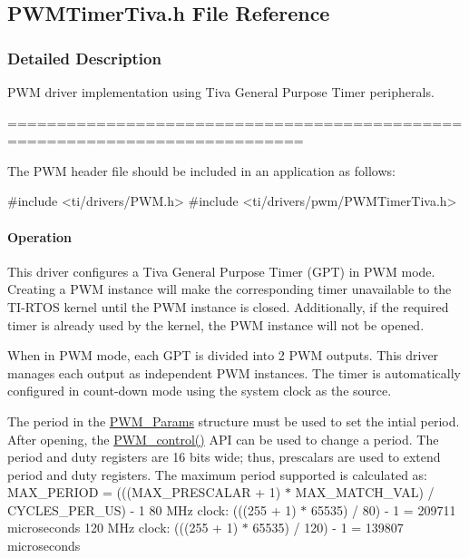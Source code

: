 \subsection{P\+W\+M\+Timer\+Tiva.\+h File Reference}
\label{_p_w_m_timer_tiva_8h}


\subsubsection{Detailed Description}
P\+W\+M driver implementation using Tiva General Purpose Timer peripherals. 

============================================================================

The P\+W\+M header file should be included in an application as follows\+: 
\begin{DoxyCode}
\textcolor{preprocessor}{#include <ti/drivers/PWM.h>}
\textcolor{preprocessor}{#include <ti/drivers/pwm/PWMTimerTiva.h>}
\end{DoxyCode}


\paragraph*{Operation}

This driver configures a Tiva General Purpose Timer (G\+P\+T) in P\+W\+M mode. Creating a P\+W\+M instance will make the corresponding timer unavailable to the T\+I-\/\+R\+T\+O\+S kernel until the P\+W\+M instance is closed. Additionally, if the required timer is already used by the kernel, the P\+W\+M instance will not be opened.

When in P\+W\+M mode, each G\+P\+T is divided into 2 P\+W\+M outputs. This driver manages each output as independent P\+W\+M instances. The timer is automatically configured in count-\/down mode using the system clock as the source.

The period in the \hyperlink{struct_p_w_m___params}{P\+W\+M\+\_\+\+Params} structure must be used to set the intial period. After opening, the \hyperlink{_p_w_m_8h_ade999f5b12997479efa1ac85aaf46ef5}{P\+W\+M\+\_\+control()} A\+P\+I can be used to change a period. The period and duty registers are 16 bits wide; thus, prescalars are used to extend period and duty registers. The maximum period supported is calculated as\+: M\+A\+X\+\_\+\+P\+E\+R\+I\+O\+D = (((M\+A\+X\+\_\+\+P\+R\+E\+S\+C\+A\+L\+A\+R + 1) $\ast$ M\+A\+X\+\_\+\+M\+A\+T\+C\+H\+\_\+\+V\+A\+L) / C\+Y\+C\+L\+E\+S\+\_\+\+P\+E\+R\+\_\+\+U\+S) -\/ 1 80 M\+Hz clock\+: (((255 + 1) $\ast$ 65535) / 80) -\/ 1 = 209711 microseconds 120 M\+Hz clock\+: (((255 + 1) $\ast$ 65535) / 120) -\/ 1 = 139807 microseconds


